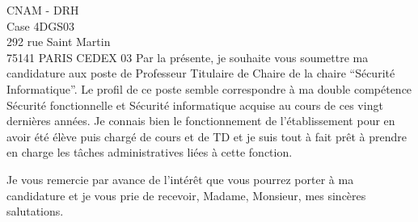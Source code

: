 \documentclass[a4paper,12pt]{lettre}
\begin{document}
\begin{letter}{
    CNAM - DRH\\
    Case 4DGS03\\
    292 rue Saint Martin\\ 
    75141 PARIS CEDEX 03}
Par la pr\'esente, je souhaite vous soumettre ma candidature aux poste
de Professeur Titulaire de Chaire de la chaire ``S\'ecurit\'e
Informatique''.  Le profil de ce poste semble correspondre \`a ma
double comp\'etence S\'ecurit\'e fonctionnelle et S\'ecurit\'e
informatique acquise au cours de ces vingt derni\`eres ann\'ees. Je
connais bien le fonctionnement de l'\'etablissement pour en avoir
\'et\'e \'el\`eve puis charg\'e de cours et de TD et je suis tout \`a
fait pr\^et \`a prendre en charge les t\^aches administratives li\'ees \`a
cette fonction.

 
\closing{Je vous remercie par avance de l'int\'er\^et que vous pourrez
  porter \`a ma candidature et je vous prie de recevoir, Madame,
  Monsieur, mes sinc\`eres salutations.}


\end{letter}
\end{document}
